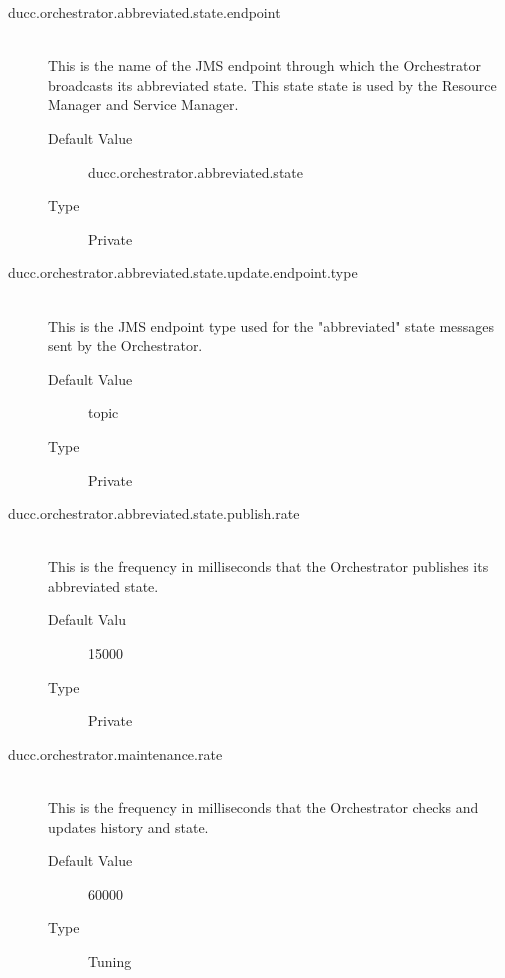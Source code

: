 \begin{description}
      \item[ducc.orchestrator.abbreviated.state.endpoint] \hfill \\
        This is the name of the JMS endpoint through which the Orchestrator broadcasts its 
        abbreviated state. This state state is used by the Resource Manager and Service Manager. 
        \begin{description}
          \item[Default Value] ducc.orchestrator.abbreviated.state 
          \item[Type] Private
        \end{description} 
        
      \item[ducc.orchestrator.abbreviated.state.update.endpoint.type] \hfill \\
        This is the JMS endpoint type used for the "abbreviated" state messages sent by the 
        Orchestrator. 
        \begin{description}
          \item[Default Value] topic 
          \item[Type] Private
        \end{description} 
        
      \item[ducc.orchestrator.abbreviated.state.publish.rate] \hfill \\
        This is the frequency in milliseconds that the Orchestrator publishes its abbreviated state. 
        \begin{description}
          \item[Default Valu] 15000 
          \item[Type] Private
        \end{description} 

      \item[ducc.orchestrator.maintenance.rate] \hfill \\
        This is the frequency in milliseconds that the Orchestrator checks and updates history and 
        state. 
        \begin{description}
          \item[Default Value] 60000 
          \item[Type] Tuning 
        \end{description}
        

\end{description}
